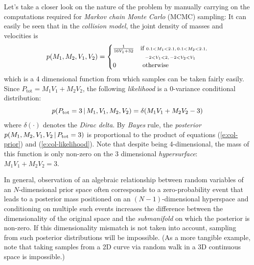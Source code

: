 Let's take a closer look on the nature of the problem by manually carrying on the computations required for 
\emph{Markov chain Monte Carlo} (MCMC) sampling:
It can easily be seen that in the \emph{collision model}, 
the joint density of masses and velocities is
\begin{equation} \footnotesize  
\label{e:col-prior}
\pr(M_1, M_2, V_1, V_2)  
=
\begin{cases}
\frac{1}{16 V_1 + 32} &{\text{if }\scriptstyle 0.1<M_1<2.1, \, 0.1<M_2<2.1,}\\
							 &{\;\;\, \scriptstyle -2<V_1<2, \, -2<V_2 < V_1}\\
 \otherwise{0}
 \end{cases}
\end{equation}
which is a 4 dimensional function from which samples can be taken fairly easily. 
Since {\footnotesize $P_\text{tot} = M_1 V_1 + M_2 V_2$}, 
the following \emph{likelihood} is a 0-variance conditional distribution:
\begin{equation}\footnotesize 
\label{e:col-likelihood}
\pr(P_\text{tot} = 3 \,|\, M_1, V_1, M_2, V_2) = \delta( M_1 V_1 + M_2 V_2 - 3)
\end{equation}
where $\delta(\cdot)$ denotes the \emph{Dirac delta}. 
By \emph{Bayes} rule, 
the \emph{posterior} 
{\footnotesize $p(M_1, M_2, V_1, V_2 \,|\, P_\text{tot} = 3)$}
is proportional to the product of equations (\ref{e:col-prior}) and (\ref{e:col-likelihood}).
Note that despite being 4-dimensional, 
the mass of this function is only non-zero on the 3 dimensional \emph{hypersurface}: {\footnotesize$M_1 V_1 + M_2 V_2 = 3$}. 


In general, observation of an algebraic relationship between random variables of an {\footnotesize$N$}-dimensional prior space often corresponds to a zero-probability event that leads to a posterior mass positioned on an {\footnotesize$(N\!-\!1)$}-dimensional hyperspace and conditioning on multiple such events increases the difference between the dimensionality of the original space and the \emph{submanifold} on which the posterior is non-zero.  
If this dimensionality mismatch is not taken into account, sampling from such posterior distributions will be impossible. (As a more tangible example, note that taking samples from a 2D curve via random walk in a 3D continuous space is impossible.)  

